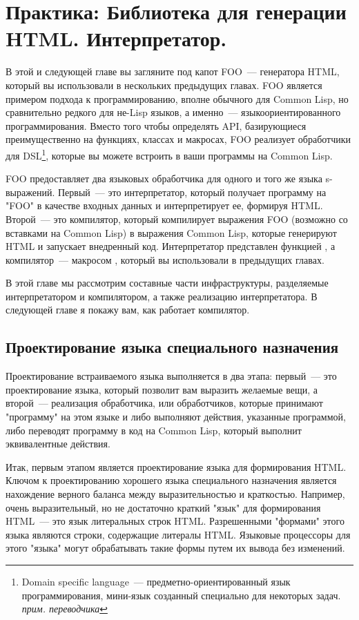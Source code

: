 \chapter{Практика: Библиотека для генерации HTML. Интерпретатор.}
\label{ch:30}

В этой и следующей главе вы загляните под капот FOO~--- генератора HTML, который вы
использовали в нескольких предыдущих главах. FOO является примером подхода к
программированию, вполне обычного для Common Lisp, но сравнительно редкого для не-Lisp
языков, а именно~--- языкоориентированного программирования. Вместо того чтобы определять
API, базирующиеся преимущественно на функциях, классах и макросах, FOO реализует
обработчики для DSL\footnote{Domain specific language~--- предметно-ориентированный язык
  программирования, мини-язык созданный специально для некоторых задач.
  \textit{прим. переводчика}}, которые вы можете встроить в ваши программы на Common Lisp.

FOO предоставляет два языковых обработчика для одного и того же языка
s-выражений. Первый~--- это интерпретатор, который получает программу на "FOO" в качестве
входных данных и интерпретирует ее, формируя HTML. Второй~--- это компилятор, который
компилирует выражения FOO (возможно со вставками на Common Lisp) в выражения Common Lisp,
которые генерируют HTML и запускает внедренный код. Интерпретатор представлен функцией
, а компилятор~--- макросом , который вы использовали в
предыдущих главах.

В этой главе мы рассмотрим составные части инфраструктуры, разделяемые интерпретатором и
компилятором, а также реализацию интерпретатора. В следующей главе я покажу вам, как
работает компилятор.

\section{Проектирование языка специального назначения}

Проектирование встраиваемого языка выполняется в два этапа: первый~--- это проектирование
языка, который позволит вам выразить желаемые вещи, а второй~--- реализация обработчика,
или обработчиков, которые принимают "программу" на этом языке и либо выполняют действия,
указанные программой, либо переводят программу в код на Common Lisp, который выполнит
эквивалентные действия.

Итак, первым этапом является проектирование языка для формирования HTML. Ключом к
проектированию хорошего языка специального назначения является нахождение верного баланса
между выразительностью и краткостью. Например, очень выразительный, но не достаточно
краткий "язык" для формирования HTML~--- это язык литеральных строк HTML. Разрешенными
"формами" этого языка являются строки, содержащие литералы HTML.  Языковые процессоры для
этого "языка" могут обрабатывать такие формы путем их вывода без изменений.

